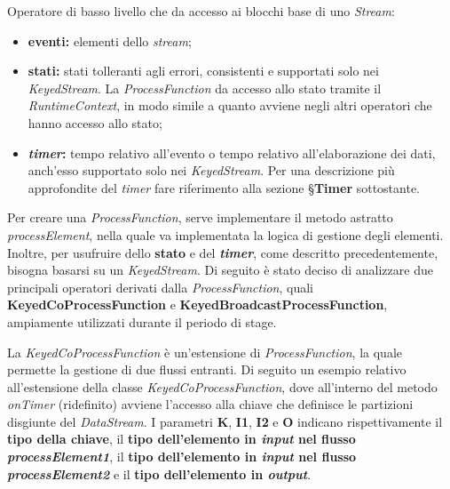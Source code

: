 Operatore di basso livello che da accesso ai blocchi base di uno \textit{Stream}:
\begin{itemize}
	\item{\textbf{eventi:} elementi dello \textit{stream};}
	\item{\textbf{stati:} stati tolleranti agli errori, consistenti e supportati solo nei \textit{KeyedStream}. La \textit{ProcessFunction} da accesso allo stato tramite il \textit{RuntimeContext}, in modo simile a quanto avviene negli altri operatori che hanno accesso allo stato;}
	\item{\textbf{\textit{timer}:} tempo relativo all'evento o tempo relativo all'elaborazione dei dati, anch'esso supportato solo nei \textit{KeyedStream}. Per una descrizione più approfondite del \textit{timer} fare riferimento alla sezione \S\textbf{Timer} sottostante.}
\end{itemize}

Per creare una \textit{ProcessFunction}, serve implementare il metodo astratto \textit{processElement}, nella quale va implementata la logica di gestione degli elementi. Inoltre, per usufruire dello \textbf{stato} e del \textbf{\textit{timer}}, come descritto precedentemente, bisogna basarsi su un \textit{KeyedStream}. Di seguito è stato deciso di analizzare due principali operatori derivati dalla \textit{ProcessFunction}, quali \textbf{KeyedCoProcessFunction} e \textbf{KeyedBroadcastProcessFunction}, ampiamente utilizzati durante il periodo di stage.

La \textit{KeyedCoProcessFunction} è un'estensione di \textit{ProcessFunction}, la quale permette la gestione di due flussi entranti. Di seguito un esempio relativo all'estensione della classe \textit{KeyedCoProcessFunction}, dove all'interno del metodo \textit{onTimer} (ridefinito) avviene l'accesso alla chiave che definisce le partizioni disgiunte del \textit{DataStream}. I parametri \textbf{K}, \textbf{I1}, \textbf{I2} e \textbf{O} indicano rispettivamente il \textbf{tipo della chiave}, il \textbf{tipo dell'elemento in \textit{input} nel flusso \textit{processElement1}}, il \textbf{tipo dell'elemento in \textit{input} nel flusso \textit{processElement2}} e il \textbf{tipo dell'elemento in \textit{output}}.

